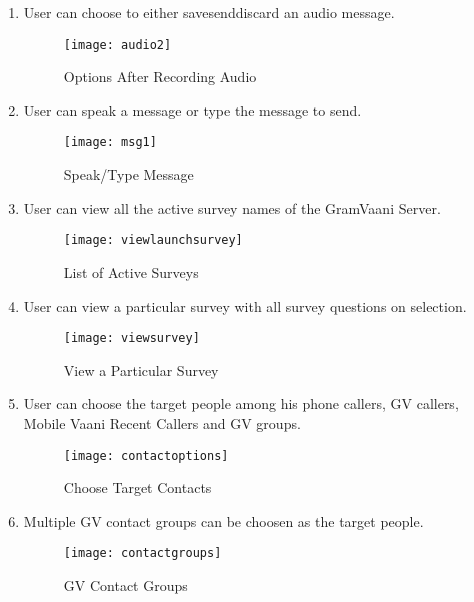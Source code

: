 \begin {enumerate}
\item User can choose to either save\/send\/discard an audio message.
\begin{figure}[here]
\begin{center}   
\texttt{[image: audio2]}
\caption{Options After Recording Audio}
\label{fig:audio2}
\end{center}
\end{figure}

\item User can speak a message or type the message to send.
\begin{figure}[here]
\begin{center}   
\texttt{[image: msg1]}
\caption{Speak/Type Message}
\label{fig:msg1}
\end{center}
\end{figure}

\item User can view all the active survey names of the GramVaani Server.
\begin{figure}[here]
\begin{center}   
\texttt{[image: viewlaunchsurvey]}
\caption{List of Active Surveys}
\label{fig:viewlaunchsurvey}
\end{center}
\end{figure}

\item User can view a particular survey with all survey questions on selection.
\begin{figure}[here]
\begin{center}   
\texttt{[image: viewsurvey]}
\caption{View a Particular Survey}
\label{fig:viewsurvey}
\end{center}
\end{figure}

\item User can choose the target people among his phone callers, GV callers, Mobile Vaani Recent Callers and GV groups.
\begin{figure}[here]
\begin{center}   
\texttt{[image: contactoptions]}
\caption{Choose Target Contacts}
\label{fig:contactoptions}
\end{center}
\end{figure}

\item Multiple GV contact groups can be choosen as the target people.
\begin{figure}[here]
\begin{center}   
\texttt{[image: contactgroups]}
\caption{GV Contact Groups}
\label{fig:contactgroups}
\end{center}
\end{figure}


\end{enumerate}
